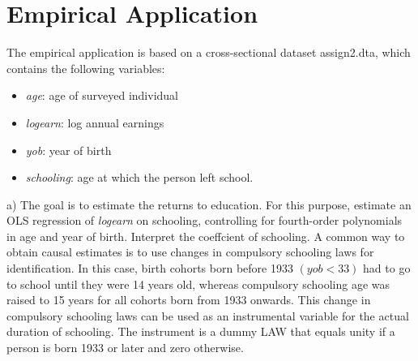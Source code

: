 \documentclass[a4paper,12pt,oneside,English]{article}
\begin{document}
\newpage
\section{Empirical Application}

The empirical application is based on a cross-sectional dataset assign2.dta, which contains the following variables:
\begin{itemize}
    \item \textit{age}: age of surveyed individual
    \item \textit{logearn}: log annual earnings
    \item \textit{yob}: year of birth
    \item \textit{schooling}: age at which the person left school.
\end{itemize}
a) The goal is to estimate the returns to education. For this purpose, estimate an OLS regression of \textit{logearn} on schooling, controlling for fourth-order polynomials in age and year of birth. Interpret the coeffcient of schooling.
A common way to obtain causal estimates is to use changes in compulsory schooling laws for identification. In this case, birth cohorts born before 1933 $(yob<33)$ had to go to school until they were 14 years old, whereas compulsory schooling age was raised to 15 years for all cohorts born from 1933 onwards. This change in compulsory schooling laws can be used as an instrumental variable for the actual duration of schooling. The instrument is a dummy LAW that equals unity if a person is born 1933 or later and zero otherwise.
\end{document}
